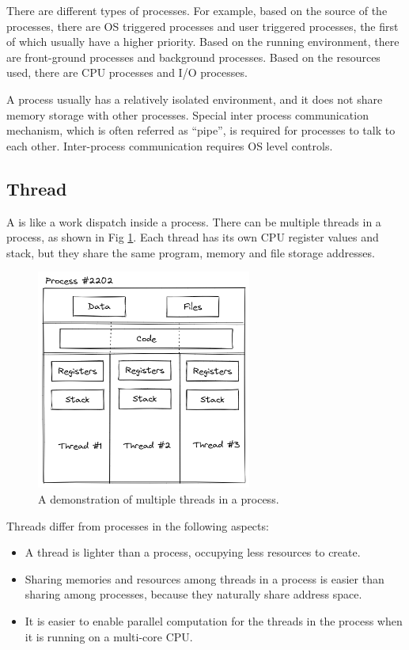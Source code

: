 There are different types of processes. For example, based on the source of the processes, there are OS triggered processes and user triggered processes, the first of which usually have a higher priority. Based on the running environment, there are front-ground processes and background processes. Based on the resources used, there are CPU processes and I/O processes.

A process usually has a relatively isolated environment, and it does not share memory storage with other processes. Special inter process communication mechanism, which is often referred as ``pipe'', is required for processes to talk to each other. Inter-process communication requires OS level controls.

\subsection{Thread}

A  is like a work dispatch inside a process. There can be multiple threads in a process, as shown in Fig \ref{ch:pm:fig:threadinprocess}. Each thread has its own CPU register values and stack, but they share the same program, memory and file storage addresses.
\begin{figure}[!htb]
	\centering
	\includegraphics[width=200pt]{chapters/part-1/figures/threadinprocess.png}
	\caption{A demonstration of multiple threads in a process.} \label{ch:pm:fig:threadinprocess}
\end{figure}

Threads differ from processes in the following aspects:
\begin{itemize}
  \item A thread is lighter than a process, occupying less resources to create.
  \item Sharing memories and resources among threads in a process is easier than sharing among processes, because they naturally share address space.
  \item It is easier to enable parallel computation for the threads in the process when it is running on a multi-core CPU.
\end{itemize}

